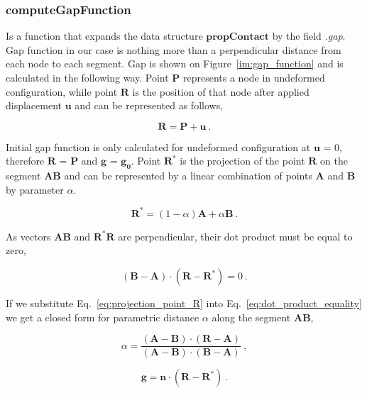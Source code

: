 \documentclass[10pt,a4paper]{article}
\begin{document}
\subsubsection{computeGapFunction}

Is a function that expands the data structure $\textbf{propContact}$ by the field \textit{.gap}. Gap function in our case is nothing more than a perpendicular distance from each node to each segment. Gap is shown on Figure~\ref{im:gap_function} and is calculated in the following way. Point $\mathbf{P}$ represents a node in undeformed configuration, while point $\mathbf{R}$ is the position of that node after applied displacement $\mathbf{u}$ and can be represented as follows,

\begin{equation}
	\mathbf{R} = \mathbf{P} + \mathbf{u} \:.
	\label{eq:point_after_displacement}
\end{equation}

Initial gap function is only calculated for undeformed configuration at $\mathbf{u}$ = 0, therefore $\mathbf{R}$ = $\mathbf{P}$ and $\mathbf{g}$ = $\mathbf{g_0}$. Point $\mathbf{R}^*$ is the projection of the point $\mathbf{R}$ on the segment $\mathbf{AB}$ and can be represented by a linear combination of points $\mathbf{A}$ and $\mathbf{B}$ by parameter $\alpha$.

\begin{equation}
	\mathbf{R}^\ast = (1-\alpha)\mathbf{A} + \alpha\mathbf{B} \:.
	\label{eq:projection_point_R}
\end{equation}

As vectors $\mathbf{AB}$ and $\mathbf{R}^*\mathbf{R}$ are perpendicular, their dot product must be equal to zero,

\begin{equation}
	(\mathbf{B}-\mathbf{A})\cdot(\mathbf{R}-\mathbf{R}^*) = 0 \:.
	\label{eq:dot_product_equality}
\end{equation}

If we substitute Eq.~\eqref{eq:projection_point_R} into Eq.~\eqref{eq:dot_product_equality} we get a closed form for parametric distance $\alpha$ along the segment $\mathbf{AB}$,

\begin{equation}
	\alpha = \frac{(\mathbf{A}-\mathbf{B})\cdot(\mathbf{R}-\mathbf{A})}{(\mathbf{A}-\mathbf{B})\cdot(\mathbf{B}-\mathbf{A})}  \:,
	\label{eq:parameter_alpha}
\end{equation}

\begin{equation}
	\mathbf{g} = \mathbf{n}\cdot(\mathbf{R}-\mathbf{R}^*)  \:.
	\label{eq:gap}
\end{equation}
\end{document}
